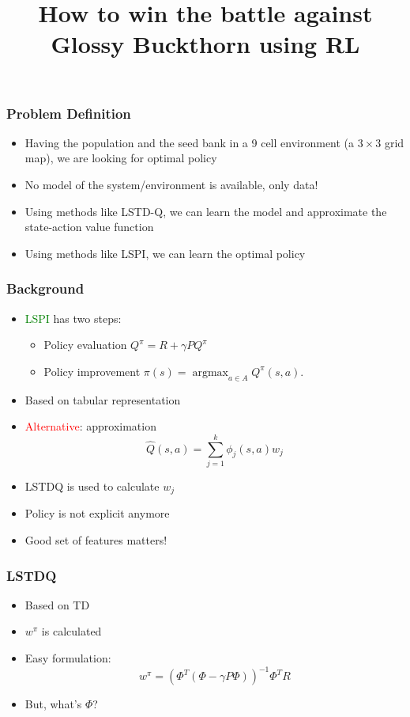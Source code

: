 \documentclass{beamer}
\title{How to win the battle against Glossy Buckthorn using RL}
\date{}
\DeclareMathOperator{\argmax}{argmax} %
\newcommand{\tc}[2]{\textcolor{#1}{#2}}
\newcommand{\tcr}[1]{\tc{red}{#1}}
\newcommand{\tcg}[1]{\tc{green}{#1}}
\begin{document}
\begin{frame}
	\maketitle

\end{frame}
\begin{frame}
	\frametitle{Problem Definition}
	\begin{itemize}
		\item Having the population and the seed bank in a 9 cell environment (a $3 \times3$ grid map), we are looking for optimal policy
		\item No model of the system/environment is available, only data!
		\item Using methods like LSTD-Q, we can learn the model and approximate the state-action value function
		\item Using methods like LSPI, we can learn the optimal policy
	\end{itemize}

\end{frame}

\begin{frame}
	\frametitle{Background}
	\begin{itemize}
		\item \tcg{LSPI} has two steps:
		\begin{itemize}
			\item Policy evaluation \qquad $Q^\pi = R + \gamma P Q^\pi$
			\item Policy improvement \quad $ \pi(s) = \argmax_{a \in A} Q^\pi (s,a).$
		\end{itemize}
		\item Based on tabular representation
		\item \tcr{Alternative}: approximation
		  $$\hat{Q}(s,a) = \sum_{j=1}^k \phi_j(s,a) w_j$$
		\item LSTDQ is used to calculate $w_j$
		\item Policy is not explicit anymore
		\item Good set of features matters!
	\end{itemize}
\end{frame}

\begin{frame}
	\frametitle{LSTDQ}
	\begin{itemize}
		\item Based on TD
		\item $w^\pi$ is calculated
		\item Easy formulation:
		\[ w^\pi = (\Phi^T(\Phi - \gamma P \Phi))^{-1} \Phi^T R
		\]
		\item But, what's $\Phi$?
	\end{itemize}
\end{frame}
\end{document}
